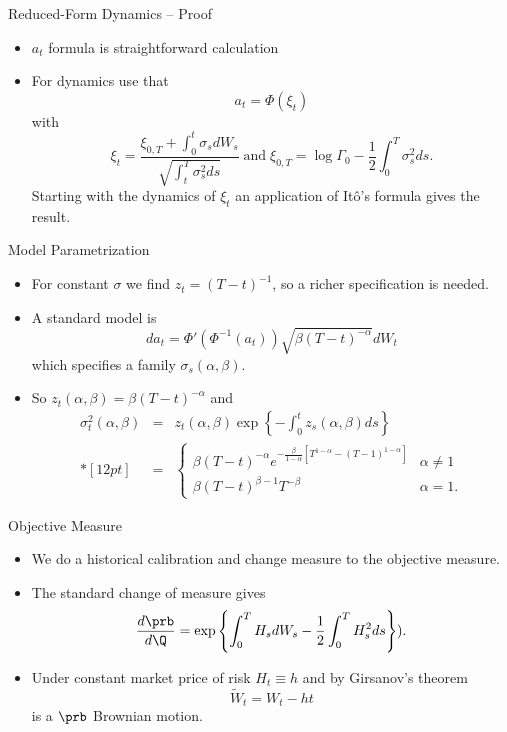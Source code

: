 {Reduced-Form Dynamics -- Proof}
\begin{itemize}
\item<1-> $a_t$ formula is straightforward calculation
\item<2-> For dynamics use that
$$
a_t = \Phi(\xi_t)
$$
with
$$
\xi_t = \frac{\xi_{0,T}+\int_0^t\sigma_s dW_s}{\sqrt{\int_t^T\sigma_s^2ds}}\; \mbox{and}\;  \xi_{0,T}=\log \Gamma_0 - \frac{1}{2} \int_0^T\sigma_s^2ds.
$$
Starting with the dynamics of $\xi_t$ an application of It{\^o}'s formula gives the result.
\end{itemize}



{Model Parametrization}
\begin{itemize}
\item<1-> For constant $\sigma$ we find $z_t=(T-t)^{-1}$, so a richer specification is needed.
\item<2-> A standard model is
$$
da_t = \Phi'\left(\Phi^{-1}(a_t)\right)\sqrt{\beta(T-t)^{-\alpha}}dW_t
$$
which specifies a family $\sigma_s(\alpha,\beta)$.
\item<3->
So $z_t(\alpha, \beta) = \beta(T-t)^{-\alpha}$ and
$$
\begin{array}{lll}
\sigma_t^2(\alpha,\beta)&=& \displaystyle z_t(\alpha, \beta) \exp\left\{-\int_0^t z_s(\alpha, \beta) ds \right\}\\*[12pt]
&=&\displaystyle
\left\{
\begin{array}{ll}
\beta(T-t)^{-\alpha} e^{-\frac{\beta}{1-\alpha}[T^{1-\alpha}-(T-1)^{1-\alpha}]} &\alpha \not=1\\
\beta(T-t)^{\beta-1}T^{-\beta} &\alpha=1.
\end{array}
\right.
\end{array}
$$
\end{itemize}


{Objective Measure}
\begin{itemize}
\item<1-> We do a historical calibration and change measure to the objective measure.
\item<2-> The standard change of measure gives
$$
\frac{d\prb}{d\Q} = \exp\left\{\int_0^T H_s dW_s -\frac{1}{2} \int_0^T H_s^2ds \right\}).
$$
\item<3->
Under constant market price of risk $H_t \equiv h$ and by Girsanov's theorem
$$
\tilde{W}_t = W_t - ht
$$
is a $\prb$ Brownian motion.
\end{itemize}


